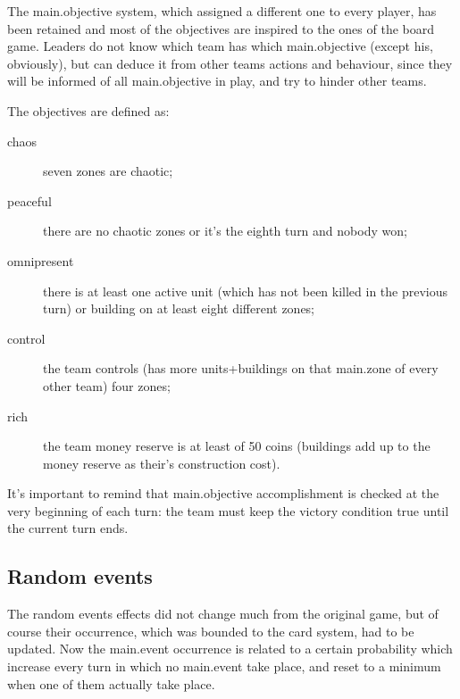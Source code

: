 			The main.objective system, which assigned a different one to every player, has been retained and most of the objectives are inspired to the ones of the board game. Leaders do not know which team has which main.objective (except his, obviously), but can deduce it from other teams actions and behaviour, since they will be informed of all main.objective in play, and try to hinder other teams.
			
			The objectives are defined as:
			\begin{description}
				\item[chaos] seven zones are chaotic;
				\item[peaceful] there are no chaotic zones or it's the eighth turn and nobody won;
				\item[omnipresent] there is at least one active unit (which has not been killed in the previous turn) or building on at least eight different zones;
				\item[control] the team controls (has more units+buildings on that main.zone of every other team) four zones;
				\item[rich] the team money reserve is at least of 50 coins (buildings add up to the money reserve as their's construction cost).
			\end{description}
			
			It's important to remind that main.objective accomplishment is checked at the very beginning of each turn: the team must keep the victory condition true until the current turn ends.
			
		\subsection{Random events}
			
			The random events effects did not change much from the original game, but of course their occurrence, which was bounded to the card system, had to be updated. Now the main.event occurrence is related to a certain probability which increase every turn in which no main.event take place, and reset to a minimum when one of them actually take place.
			
